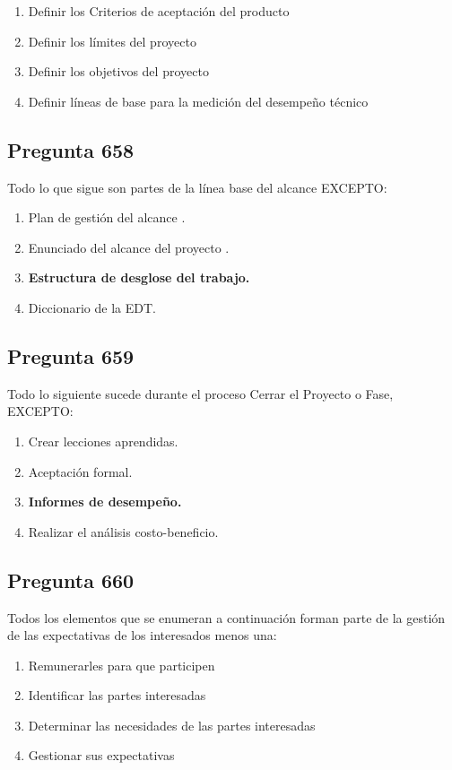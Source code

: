 \documentclass[11pt,a4paper]{article}
\begin{document}
\begin{enumerate}[label=\alph*)]
  \item Definir los Criterios de aceptación del producto
  \item Definir los límites del proyecto
  \item Definir los objetivos del proyecto
  \item Definir líneas de base para la medición del desempeño técnico
\end{enumerate}

\subsection*{Pregunta 658}
Todo lo que sigue son partes de la línea base del alcance EXCEPTO:

\begin{enumerate}[label=\alph*)]
  \item Plan de gestión del alcance .
  \item Enunciado del alcance del proyecto .
  \item \textbf{Estructura de desglose del trabajo.}
  \item Diccionario de la EDT.
\end{enumerate}

\subsection*{Pregunta 659}
Todo lo siguiente sucede durante el proceso Cerrar el Proyecto o Fase, EXCEPTO:

\begin{enumerate}[label=\alph*)]
  \item Crear lecciones aprendidas.
  \item Aceptación formal.
  \item \textbf{Informes de desempeño.}
  \item Realizar el análisis costo-beneficio.
\end{enumerate}

\subsection*{Pregunta 660}
Todos los elementos que se enumeran a continuación forman parte de la gestión de las expectativas de los interesados menos una:

\begin{enumerate}[label=\alph*)]
  \item Remunerarles para que participen
  \item Identificar las partes interesadas
  \item Determinar las necesidades de las partes interesadas
  \item Gestionar sus expectativas
\end{enumerate}
\end{document}
